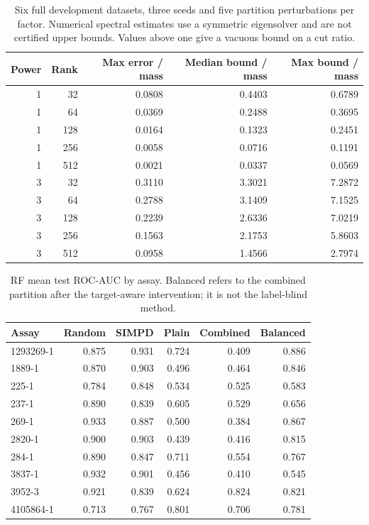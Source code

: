\begin{table}[htbp]\centering\small
\begin{tabular}{rrrrr}
\toprule
Power & Rank & Max error / mass & Median bound / mass & Max bound / mass \\
\midrule
1 & 32 & 0.0808 & 0.4403 & 0.6789 \\
1 & 64 & 0.0369 & 0.2488 & 0.3695 \\
1 & 128 & 0.0164 & 0.1323 & 0.2451 \\
1 & 256 & 0.0058 & 0.0716 & 0.1191 \\
1 & 512 & 0.0021 & 0.0337 & 0.0569 \\
3 & 32 & 0.3110 & 3.3021 & 7.2872 \\
3 & 64 & 0.2788 & 3.1409 & 7.1525 \\
3 & 128 & 0.2239 & 2.6336 & 7.0219 \\
3 & 256 & 0.1563 & 2.1753 & 5.8603 \\
3 & 512 & 0.0958 & 1.4566 & 2.7974 \\
\bottomrule
\end{tabular}

\caption{Six full development datasets, three seeds and five partition perturbations per factor. Numerical spectral estimates use a symmetric eigensolver and are not certified upper bounds. Values above one give a vacuous bound on a cut ratio.}\end{table}
\begin{table}[htbp]\centering\small
\begin{tabular}{lrrrrr}
\toprule
Assay & Random & SIMPD & Plain & Combined & Balanced \\
\midrule
1293269-1 & 0.875 & 0.931 & 0.724 & 0.409 & 0.886 \\
1889-1 & 0.870 & 0.903 & 0.496 & 0.464 & 0.846 \\
225-1 & 0.784 & 0.848 & 0.534 & 0.525 & 0.583 \\
237-1 & 0.890 & 0.839 & 0.605 & 0.529 & 0.656 \\
269-1 & 0.933 & 0.887 & 0.500 & 0.384 & 0.867 \\
2820-1 & 0.900 & 0.903 & 0.439 & 0.416 & 0.815 \\
284-1 & 0.890 & 0.847 & 0.711 & 0.554 & 0.767 \\
3837-1 & 0.932 & 0.901 & 0.456 & 0.410 & 0.545 \\
3952-3 & 0.921 & 0.839 & 0.624 & 0.824 & 0.821 \\
4105864-1 & 0.713 & 0.767 & 0.801 & 0.706 & 0.781 \\
\bottomrule
\end{tabular}

\caption{RF mean test ROC-AUC by assay. Balanced refers to the combined partition after the target-aware intervention; it is not the label-blind method.}\end{table}

